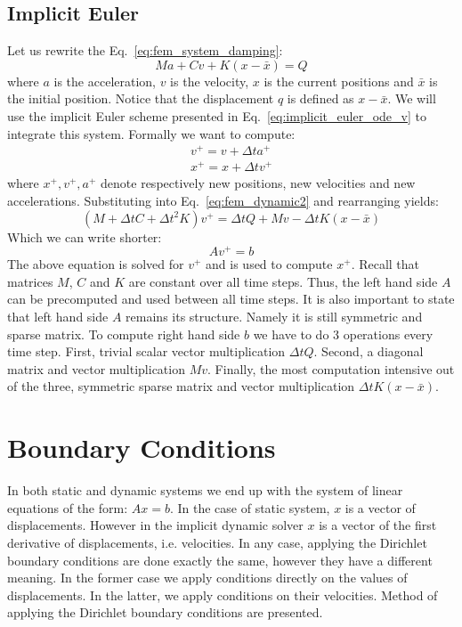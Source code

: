 \documentclass[en]{minipw} %
\begin{document}
\subsection{Implicit Euler}
\label{sec:ImplicitEuler}
Let us rewrite the Eq.~\ref{eq:fem_system_damping}:
\begin{equation}
\label{eq:fem_dynamic2}
M a + C v + K(x-\bar{x}) = Q
\end{equation}
where $a$ is the acceleration, $v$ is the velocity, $x$ is the current positions and $\bar{x}$ is the initial position. Notice that the displacement $q$ is defined as $x-\bar{x}$. We will use the implicit Euler scheme presented in Eq.~\ref{eq:implicit_euler_ode_v} to integrate this system. Formally we want to compute:
\begin{equation}
\begin{aligned}
v^{+} = v + \Delta t a^{+}
\\
x^{+} = x + \Delta t v^{+}
\end{aligned}
\end{equation}
where $x^{+}, v^{+}, a^{+}$ denote respectively new positions, new velocities and new accelerations. Substituting into Eq.~\ref{eq:fem_dynamic2} and rearranging yields:
\begin{equation}
\label{eq:fem_dynamic3}
(M + \Delta t C + \Delta t^{2} K)v^{+} = \Delta t Q + Mv - \Delta t K(x-\bar{x})
\end{equation} 
Which we can write shorter:
\begin{equation}
\label{eq:fem_dynamic4}
Av^{+} = b
\end{equation} 
The above equation is solved for $v^{+}$ and is used to compute $x^{+}$.
Recall that matrices $M$, $C$ and $K$ are constant over all time steps. Thus, the left hand side $A$ can be precomputed and used between all time steps. It is also important to state that left hand side $A$ remains its structure. Namely it is still symmetric and sparse matrix. 
To compute right hand side $b$ we have to do 3 operations every time step. First, trivial scalar vector multiplication $\Delta t Q$. Second, a diagonal matrix and vector multiplication $Mv$. Finally, the most computation intensive out of the three, symmetric sparse matrix and vector multiplication $\Delta t K(x-\bar{x})$.

\section{Boundary Conditions}
In both static and dynamic systems we end up with the system of linear equations of the form: $Ax=b$. In the case of static system, $x$ is a vector of displacements. However in the implicit dynamic solver $x$ is a vector of the first derivative of displacements, i.e. velocities. In any case, applying the Dirichlet boundary conditions are done exactly the same, however they have a different meaning. In the former case we apply conditions directly on the values of displacements. In the latter, we apply conditions on their velocities. Method of applying the Dirichlet boundary conditions are presented.
\end{document}
